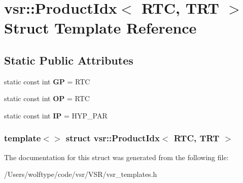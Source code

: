 \hypertarget{structvsr_1_1_product_idx_3_01_r_t_c_00_01_t_r_t_01_4}{\section{vsr\-:\-:Product\-Idx$<$ R\-T\-C, T\-R\-T $>$ Struct Template Reference}
\label{structvsr_1_1_product_idx_3_01_r_t_c_00_01_t_r_t_01_4}
}
\subsection*{Static Public Attributes}
\begin{DoxyCompactItemize}
\item 
\hypertarget{structvsr_1_1_product_idx_3_01_r_t_c_00_01_t_r_t_01_4_a2105c3072ad758220b7f09420a70b727}{static const int {\bfseries G\-P} = R\-T\-C}\label{structvsr_1_1_product_idx_3_01_r_t_c_00_01_t_r_t_01_4_a2105c3072ad758220b7f09420a70b727}

\item 
\hypertarget{structvsr_1_1_product_idx_3_01_r_t_c_00_01_t_r_t_01_4_a0273ccedaa3cc7e87cf6633bb55fcb14}{static const int {\bfseries O\-P} = R\-T\-C}\label{structvsr_1_1_product_idx_3_01_r_t_c_00_01_t_r_t_01_4_a0273ccedaa3cc7e87cf6633bb55fcb14}

\item 
\hypertarget{structvsr_1_1_product_idx_3_01_r_t_c_00_01_t_r_t_01_4_a067713b931f0dba012cf70aa963ef799}{static const int {\bfseries I\-P} = H\-Y\-P\-\_\-\-P\-A\-R}\label{structvsr_1_1_product_idx_3_01_r_t_c_00_01_t_r_t_01_4_a067713b931f0dba012cf70aa963ef799}

\end{DoxyCompactItemize}
\subsubsection*{template$<$$>$ struct vsr\-::\-Product\-Idx$<$ R\-T\-C, T\-R\-T $>$}



The documentation for this struct was generated from the following file\-:\begin{DoxyCompactItemize}
\item 
/\-Users/wolftype/code/vsr/\-V\-S\-R/vsr\-\_\-templates.\-h\end{DoxyCompactItemize}
